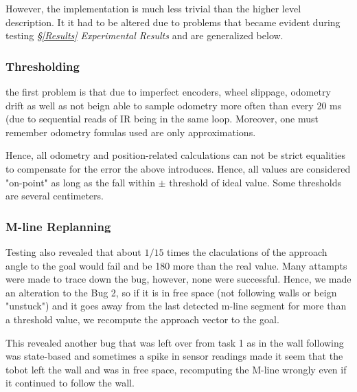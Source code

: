 \documentclass[11pt, a4paper]{article}
\begin{document}

However, the implementation is much less trivial than the higher level description. It it had 
to be altered due to problems that became evident during testing \textit{\S\ref{Results} Experimental Results} and are generalized below.

\subsubsection{Thresholding}



the first problem is that due to imperfect encoders, wheel slippage, odometry drift as well as not
beign able to sample odometry more often than every $20$ ms\cite{khepera_manual} (due to sequential 
reads of IR being in the same loop. Moreover, one must remember odometry fomulas used are only approximations.

Hence, all odometry and position-related calculations can not be strict equalities to compensate 
for the error the above introduces. Hence, all values are considered "on-point" as long as the 
fall within $\pm$ threshold of ideal value. Some thresholds are several centimeters.



\subsubsection{M-line Replanning}


Testing also revealed that about $1/15$ times the claculations of the approach angle to the goal would 
fail and be 180 \degree more than the real value. Many attampts were made to trace down the bug, however,
none were successful. Hence, we made an alteration to the Bug 2, so if it is in free space (not following 
walls or beign "unstuck"\cite{task1_report}) and it goes away from the last detected m-line segment for more
than a threshold value, we recompute the approach vector to the goal.

This revealed another bug that was left over from task 1 as in the wall following was state-based and sometimes
a spike in sensor readings made it seem that the tobot left the wall and was in free space, recomputing the M-line
wrongly even if it continued to follow the wall. 
\end{document}
